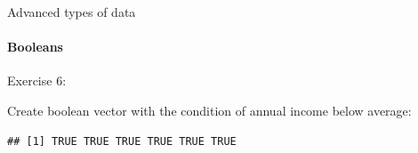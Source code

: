 \documentclass[ignorenonframetext,]{beamer}
\newenvironment{Shaded}{\begin{snugshade}}{\end{snugshade}}
\newcommand{\KeywordTok}[1]{\textcolor[rgb]{0.13,0.29,0.53}{\textbf{#1}}}
\newcommand{\StringTok}[1]{\textcolor[rgb]{0.31,0.60,0.02}{#1}}
\newcommand{\CommentTok}[1]{\textcolor[rgb]{0.56,0.35,0.01}{\textit{#1}}}
\newcommand{\OperatorTok}[1]{\textcolor[rgb]{0.81,0.36,0.00}{\textbf{#1}}}
\newcommand{\NormalTok}[1]{#1}
\begin{document}
\begin{frame}[fragile]{Advanced types of data}

\framesubtitle{Booleans}

\begin{block}{Exercise 6:}

Create boolean vector with the condition of annual income below average:

\begin{Shaded}
\end{Shaded}

\begin{verbatim}
## [1] TRUE TRUE TRUE TRUE TRUE TRUE
\end{verbatim}

\end{block}

\end{frame}
\end{document}
